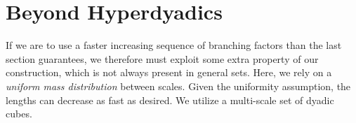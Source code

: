 
\section{Beyond Hyperdyadics}

If we are to use a faster increasing sequence of branching factors than the last section guarantees, we therefore must exploit some extra property of our construction, which is not always present in general sets. Here, we rely on a \emph{uniform mass distribution} between scales. Given the uniformity assumption, the lengths can decrease as fast as desired. We utilize a multi-scale set of dyadic cubes.

